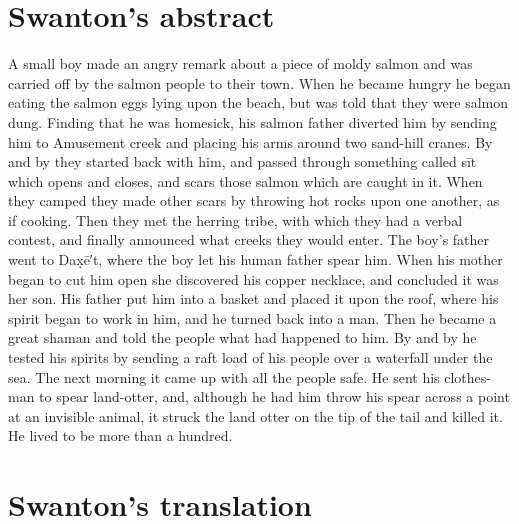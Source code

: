 \section{Swanton’s abstract}\label{sec:099-swanton-abstract}

A small boy made an angry remark about a piece of moldy salmon and was carried off by the salmon people to their town.
When he became hungry he began eating the salmon eggs lying upon the beach, but was told that they were salmon dung.
Finding that he was homesick, his salmon father diverted him by sending him to Amusement creek and placing his arms around two sand-hill cranes.
By and by they started back with him, and passed through something called sīt which opens and closes, and scars those salmon which are caught in it.
When they camped they made other scars by throwing hot rocks upon one another, as if cooking.
Then they met the herring tribe, with which they had a verbal contest, and finally announced what creeks they would enter.
The boy’s father went to Dax̣ē′t, where the boy let his human father spear him.
When his mother began to cut him open she discovered his copper necklace, and concluded it was her son.
His father put him into a basket and placed it upon the roof, where his spirit began to work in him, and he turned back into a man.
Then he became a great shaman and told the people what had happened to him.
By and by he tested his spirits by sending a raft load of his people over a waterfall under the sea.
The next morning it came up with all the people safe.
He sent his clothes-man to spear land-otter, and, although he had him throw his spear across a point at an invisible animal, it struck the land otter on the tip of the tail and killed it.
He lived to be more than a hundred.

\section{Swanton’s translation}\label{sec:099-swanton-translation}

